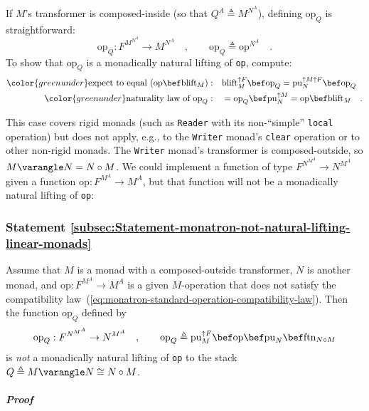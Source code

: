 If $M$\textsf{'}s transformer is composed-inside (so that $Q^{A}\triangleq M^{N^{A}}$),
defining $\text{op}_{Q}$ is straightforward:
\[
\text{op}_{Q}:F^{M^{N^{A}}}\rightarrow M^{N^{A}}\quad,\quad\quad\text{op}_{Q}\triangleq\text{op}^{N^{A}}\quad.
\]
To show that $\text{op}_{Q}$ is a monadically natural lifting of
\lstinline!op!, compute:
\begin{align*}
{\color{greenunder}\text{expect to equal }(\text{op}\bef\text{blift}_{M}):}\quad & \text{blift}_{M}^{\uparrow F}\bef\text{op}_{Q}=\text{pu}_{N}^{\uparrow M\uparrow F}\bef\text{op}_{Q}\\
{\color{greenunder}\text{naturality law of }\text{op}_{Q}:}\quad & =\text{op}_{Q}\bef\text{pu}_{N}^{\uparrow M}=\text{op}\bef\text{blift}_{M}\quad.
\end{align*}

This case covers rigid monads (such as \lstinline!Reader! with its
non-\textsf{``}simple\textsf{''} \lstinline!local! operation) but does not apply,
e.g., to the \lstinline!Writer! monad\textsf{'}s \lstinline!clear! operation
or to other non-rigid monads. The \lstinline!Writer! monad\textsf{'}s transformer
is composed-outside, so $M\varangle N=N\circ M$. We could implement
a function of type $F^{N^{M^{A}}}\rightarrow N^{M^{A}}$given a function
$\text{op}:F^{M^{A}}\rightarrow M^{A}$, but that function will not
be a monadically natural lifting of \lstinline!op!:

\subsubsection{Statement \label{subsec:Statement-monatron-not-natural-lifting-linear-monads}\ref{subsec:Statement-monatron-not-natural-lifting-linear-monads}}

Assume that $M$ is a monad with a composed-outside transformer, $N$
is another monad, and $\text{op}:F^{M^{A}}\rightarrow M^{A}$ is a
given $M$-operation that does not satisfy the compatibility law~(\ref{eq:monatron-standard-operation-compatibility-law}).
Then the function $\text{op}_{Q}$ defined by
\[
\text{op}_{Q}:F^{N^{M^{A}}}\rightarrow N^{M^{A}}\quad,\quad\quad\text{op}_{Q}\triangleq\text{pu}_{M}^{\uparrow F}\bef\text{op}\bef\text{pu}_{N}\bef\text{ftn}_{N\circ M}
\]
is \emph{not} a monadically natural lifting of \lstinline!op! to
the stack $Q\triangleq M\varangle N\cong N\circ M$.

\subparagraph{Proof}

